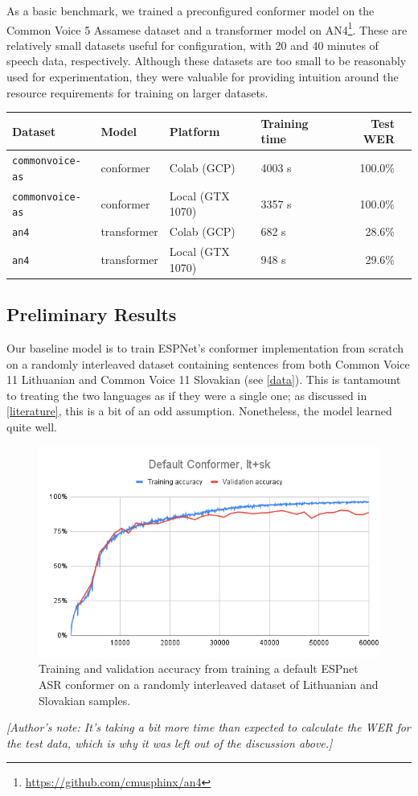 \documentclass{article}
\begin{document}
  As a basic benchmark, we trained a preconfigured conformer model on the Common Voice 5 Assamese dataset and a transformer model on AN4\footnote{\url{https://github.com/cmusphinx/an4}}. These are relatively small datasets useful for configuration, with 20 and 40 minutes of speech data, respectively. Although these datasets are too small to be reasonably used for experimentation, they were valuable for providing intuition around the resource requirements for training on larger datasets.
  \begin{center}
    \begin{tabular}{llllrr}
      \toprule
      Dataset                 & Model       & Platform         & Training time & Test WER \\\midrule
      \texttt{commonvoice-as} & conformer   & Colab (GCP)      &        4003 s &  100.0\% \\ %
      \texttt{commonvoice-as} & conformer   & Local (GTX 1070) &        3357 s &  100.0\% \\ %
      \texttt{an4}            & transformer & Colab (GCP)      &         682 s &   28.6\% \\ %
      \texttt{an4}            & transformer & Local (GTX 1070) &         948 s &   29.6\% \\\bottomrule
    \end{tabular}
  \end{center}
  \subsection{Preliminary Results}
  Our baseline model is to train ESPNet's conformer implementation from scratch on a randomly interleaved dataset containing sentences from both Common Voice 11 Lithuanian and Common Voice 11 Slovakian (see \ref{data}). This is tantamount to treating the two languages as if they were a single one; as discussed in \ref{literature}, this is a bit of an odd assumption. Nonetheless, the model learned quite well.
  \begin{figure}[H]
    \includegraphics[width=\textwidth]{images/default-conformer_lt+sk}
    \caption{Training and validation accuracy from training a default ESPnet ASR conformer on a randomly interleaved dataset of Lithuanian and Slovakian samples.}
  \end{figure}
  \textit{[Author's note: It's taking a bit more time than expected to calculate the WER for the test data, which is why it was left out of the discussion above.]}
\end{document}
